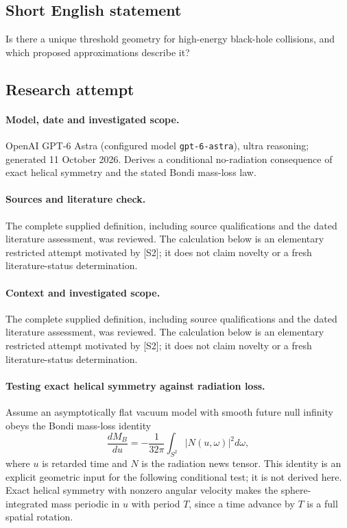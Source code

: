 \documentclass[11pt]{article}
\begin{document}
\subsection{Short English statement}
Is there a unique threshold geometry for high-energy black-hole collisions, and which proposed approximations describe it?
\subsection{Research attempt}
\paragraph{Model, date and investigated scope.}
OpenAI GPT-6 Astra (configured model \texttt{gpt-6-astra}), ultra reasoning; generated 11 October 2026. Derives a conditional no-radiation consequence of exact helical symmetry and the stated Bondi mass-loss law.

\paragraph{Sources and literature check.}
The complete supplied definition, including source qualifications and the dated literature assessment, was reviewed. The calculation below is an elementary restricted attempt motivated by [S2]; it does not claim novelty or a fresh literature-status determination.

\paragraph{Context and investigated scope.} The complete supplied definition, including source qualifications and the dated literature assessment, was reviewed. The calculation below is an elementary restricted attempt motivated by [S2]; it does not claim novelty or a fresh literature-status determination.

\paragraph{Testing exact helical symmetry against radiation loss.} Assume an asymptotically flat vacuum model with smooth future null infinity obeys the Bondi mass-loss identity
\[
 \frac{dM_B}{du}=-\frac1{32\pi}\int_{S^2}|N(u,\omega)|^2d\omega,
\]
where $u$ is retarded time and $N$ is the radiation news tensor. This identity is an explicit geometric input for the following conditional test; it is not derived here. Exact helical symmetry with nonzero angular velocity makes the sphere-integrated mass periodic in $u$ with period $T$, since a time advance by $T$ is a full spatial rotation.
\end{document}

